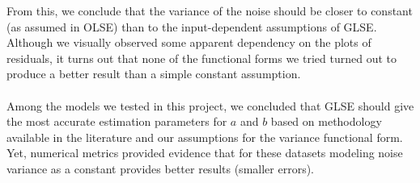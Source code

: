 \documentclass[letter,12pt]{article} %
\begin{document}
	From this,  we conclude  that the variance of the noise should be closer to constant (as assumed in OLSE) than to the input-dependent assumptions of GLSE. Although we visually observed some apparent dependency on the plots of residuals,  it turns out that none of the functional forms we tried turned out to produce a better result than a simple constant assumption. 
	\\\\
	
	Among the models we tested in this project, we concluded that GLSE should give the most accurate estimation  parameters for $a$ and $b$ based on methodology available in the literature and our assumptions for the variance functional form. Yet, numerical metrics provided evidence that for these datasets modeling noise variance  as a constant provides better results (smaller errors).
	\\\\
	
	
\end{document}
